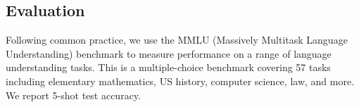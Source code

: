\subsection{Evaluation}

\begin{table}

\centering
\caption{MMLU 5-shot test results for different sizes of LLaMA finetuned on the corresponding datasets using QLoRA.}
\label{tbl:mmlu-llama}
\end{table}

Following common practice, we use the MMLU (Massively Multitask Language Understanding) benchmark \citep{hendrycksmeasuring} to measure performance on a range of language understanding tasks. This is a multiple-choice benchmark covering 57 tasks including elementary mathematics, US history, computer science, law, and more. We report 5-shot test accuracy.

